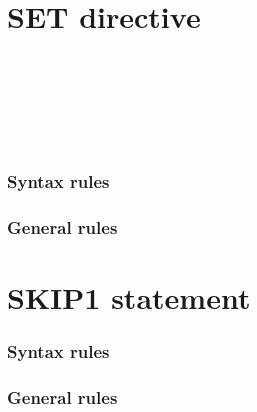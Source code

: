 \section{SET directive}

\begin{syntax}[\miscextcolour]
  \begin{1=}
    \gnucobol{\directiveindicator} \\
    \textdollar
  \end{1=}
  \begin{1=}
     \\

     \\

     \\

  \end{1=}
\end{syntax}

\subsubsection{Syntax rules}

\subsubsection{General rules}

\section{SKIP1 statement}

\begin{syntax}[\miscextcolour]
\end{syntax}

\subsubsection{Syntax rules}

\subsubsection{General rules}

